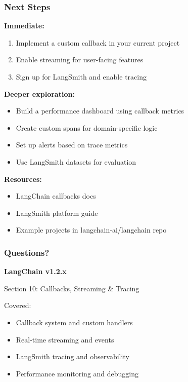 \documentclass[aspectratio=169,11pt]{beamer}
\begin{document}
\begin{frame}
  \frametitle{Next Steps}

  \textbf{Immediate:}
  \begin{enumerate}
    \setlength{\itemsep}{1pt}
    \item Implement a custom callback in your current project
    \item Enable streaming for user-facing features
    \item Sign up for LangSmith and enable tracing
  \end{enumerate}

  \vspace{0.15cm}

  \textbf{Deeper exploration:}
  \begin{itemize}
    \setlength{\itemsep}{1pt}
    \item Build a performance dashboard using callback metrics
    \item Create custom spans for domain-specific logic
    \item Set up alerts based on trace metrics
    \item Use LangSmith datasets for evaluation
  \end{itemize}

  \vspace{0.15cm}

  \textbf{Resources:}
  \begin{itemize}
    \setlength{\itemsep}{1pt}
    \item LangChain callbacks docs
    \item LangSmith platform guide
    \item Example projects in langchain-ai/langchain repo
  \end{itemize}
\end{frame}


\begin{frame}
  \frametitle{Questions?}

  \begin{center}
    \Large
    \vspace{1cm}
    \textbf{LangChain v1.2.x}

    \vspace{0.1cm}

    Section 10: Callbacks, Streaming \& Tracing

    \vspace{1cm}

    \small Covered:
    \begin{itemize}
    \setlength{\itemsep}{1pt}
      \item Callback system and custom handlers
      \item Real-time streaming and events
      \item LangSmith tracing and observability
      \item Performance monitoring and debugging
    \end{itemize}
  \end{center}
\end{frame}
\end{document}

